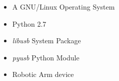 \begin{requirements}

\begin{itemize}
  \item A GNU/Linux Operating System
  \item Python 2.7
  \item {\it libusb} System Package
  \item {\it pyusb} Python Module
  \item Robotic Arm device
\end{itemize}

\end{requirements}
